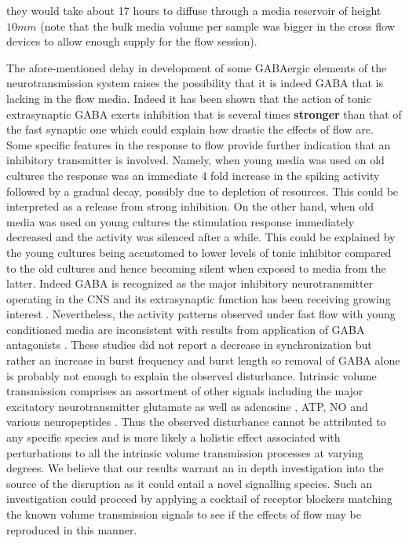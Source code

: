 they would take about 17 hours to diffuse through a media reservoir of height \(10 mm\) (note that the bulk media volume per sample was bigger in the cross flow devices to allow enough supply for the flow session).

The afore-mentioned delay in development of some GABAergic elements of the neurotransmission system raises the possibility that it is indeed GABA that is lacking in the flow media. Indeed it has been shown that the action of tonic extrasynaptic GABA exerts inhibition that is several times \textbf{stronger} than that of the fast synaptic one \cite{farrant2005variations,mody2004diversity} which could explain how drastic the effects of flow are. Some specific features in the response to flow provide further indication that an inhibitory transmitter is involved. Namely, when young media was used on old cultures the response was an immediate 4 fold increase in the spiking activity followed by a gradual decay, possibly due to depletion of resources. This could be interpreted as a release from strong inhibition. On the other hand, when old media was used on young cultures the stimulation response immediately decreased and the activity was silenced after a while. This could be explained by the young cultures being accustomed to lower levels of tonic inhibitor compared to the old cultures and hence becoming silent when exposed to media from the latter. Indeed GABA is recognized as the major inhibitory neurotransmitter operating in the CNS and its extrasynaptic function has been receiving growing interest \cite{mody2004diversity,lee2010channel,olah2009regulation}. Nevertheless, the activity patterns observed under fast flow with young conditioned media are inconsistent with results from application of GABA antagonists \cite{bikbaev2015brain,li2007long}. These studies did not report a decrease in synchronization but rather an increase in burst frequency and burst length so removal of GABA alone is probably not enough to explain the observed disturbance. Intrinsic volume transmission comprises an assortment of other signals including the major excitatory neurotransmitter glutamate \cite{cavelier2005tonic} as well as adenosine \cite{wall2015localized}, ATP, NO and various neuropeptides \cite{fuxe2010discovery,taber2014volume}. Thus the observed disturbance cannot be attributed to any specific species and is more likely a holistic effect associated with perturbations to all the intrinsic volume transmission processes at varying degrees. We believe that our results warrant an in depth investigation into the source of the disruption as it could entail a novel signalling species. Such an investigation could proceed by applying a cocktail of receptor blockers matching the known volume transmission signals to see if the effects of flow may be reproduced in this manner.

